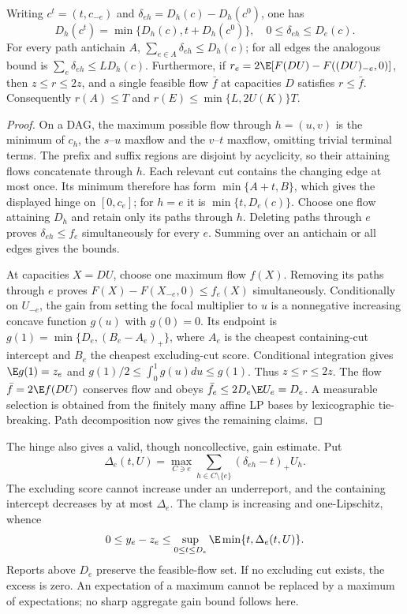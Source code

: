 \begin{lemma}\label{noise:sensitivity}
Writing $c^t=(t,c_{-e})$ and $\delta_{eh}=D_h(c)-D_h(c^0)$, one has
\[
 D_h(c^t)=\min\{D_h(c),t+D_h(c^0)\},\quad
 0\le\delta_{eh}\le D_e(c).
\]
For every path antichain $A$, $\sum_{e\in A}\delta_{eh}\le D_h(c)$;
for all edges the analogous bound is $\sum_e\delta_{eh}\le LD_h(c)$.
Furthermore, if
$r_e=2\E[F(DU)-F((DU)_{-e},0)]$, then
$z\le r\le2z$, and a single feasible flow $\bar f$ at capacities $D$
satisfies $r\le\bar f$. Consequently $r(A)\le T$ and
$r(E)\le\min\{L,2U(K)\}T$.
\end{lemma}
\begin{proof}
On a DAG, the maximum possible flow through $h=(u,v)$ is the minimum of
$c_h$, the $s$--$u$ maxflow and the $v$--$t$ maxflow, omitting trivial
terminal terms. The prefix and suffix regions are disjoint by acyclicity,
so their attaining flows concatenate through $h$. Each relevant cut
contains the changing edge at most once. Its minimum therefore has form
$\min\{A+t,B\}$, which gives the displayed hinge on $[0,c_e]$;
for $h=e$ it is $\min\{t,D_e(c)\}$.
Choose one flow attaining $D_h$ and retain only its paths through $h$.
Deleting paths through $e$ proves $\delta_{eh}\le f_e$ simultaneously
for every $e$. Summing over an antichain or all edges gives the bounds.

At capacities $X=DU$, choose one maximum flow $f(X)$. Removing its paths
through $e$ proves $F(X)-F(X_{-e},0)\le f_e(X)$ simultaneously.
Conditionally on $U_{-e}$, the gain from setting the focal multiplier to
$u$ is a nonnegative increasing concave function $g(u)$ with $g(0)=0$.
Its endpoint is $g(1)=\min\{D_e,(B_e-A_e)_+\}$, where $A_e$ is the
cheapest containing-cut intercept and $B_e$ the cheapest excluding-cut
score. Conditional integration gives $\E g(1)=z_e$ and
$g(1)/2\le\int_0^1g(u)du\le g(1)$. Thus $z\le r\le2z$.
The flow $\bar f=2\E f(DU)$ conserves flow and obeys
$\bar f_e\le2D_e\E U_e=D_e$. A measurable selection is obtained from
the finitely many affine LP bases by lexicographic tie-breaking.
Path decomposition now gives the remaining claims.
\end{proof}
The hinge also gives a valid, though noncollective, gain estimate. Put
\[
 \Delta_e(t,U)=\max_{C\ni e}\sum_{h\in C\setminus\{e\}}
                         (\delta_{eh}-t)_+U_h.
\]
The excluding score cannot increase under an underreport, and the containing
intercept decreases by at most $\Delta_e$. The clamp is increasing and
one-Lipschitz, whence
\[
 0\le y_e-z_e\le\sup_{0\le t\le D_e}\E\min\{t,\Delta_e(t,U)\}.
\]
Reports above $D_e$ preserve the feasible-flow set. If no excluding cut
exists, the excess is zero. An expectation of a maximum cannot be replaced
by a maximum of expectations; no sharp aggregate gain bound follows here.

